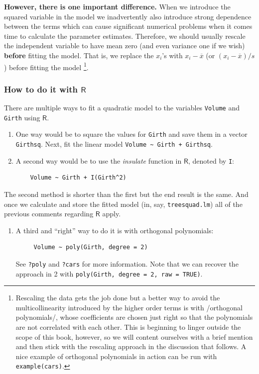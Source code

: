 \documentclass[captions=tableheading]{scrbook}
\begin{document}
\textbf{However, there is one important difference.} When we introduce the squared variable in the model we inadvertently also introduce strong dependence between the terms which can cause significant numerical problems when it comes time to calculate the parameter estimates. Therefore, we should usually rescale the independent variable to have mean zero (and even variance one if we wish) \textbf{before} fitting the model. That is, we replace the \(x_{i}\)'s with \(x_{i}-\overline{x}\) (or \((x_{i}-\overline{x})/s\)) before fitting the model
\footnote{Rescaling the data gets the job done but a better way to avoid the multicollinearity introduced by the higher order terms is with /orthogonal polynomials/, whose coefficients are chosen just right so that the polynomials are not correlated with each other. This is beginning to linger outside the scope of this book, however, so we will content ourselves with a brief mention and then stick with the rescaling approach in the discussion that follows. A nice example of orthogonal polynomials in action can be run with \texttt{example(cars)}.}.
\subsubsection{How to do it with \(\mathsf{R}\)}
\label{sec-12-4-1-1}


There are multiple ways to fit a quadratic model to the variables \texttt{Volume} and \texttt{Girth} using \(\mathsf{R}\).
\begin{enumerate}
\item One way would be to square the values for \texttt{Girth} and save them in a vector \texttt{Girthsq}. Next, fit the linear model \texttt{Volume \textasciitilde{} Girth + Girthsq}.
\item A second way would be to use the \emph{insulate} function in \(\mathsf{R}\), denoted by \texttt{I}:
\begin{verbatim}
    Volume ~ Girth + I(Girth^2)
\end{verbatim}
\end{enumerate}
The second method is shorter than the first but the end result is the same. And once we calculate and store the fitted model (in, say, \texttt{treesquad.lm}) all of the previous comments regarding \(\mathsf{R}\) apply.  
\begin{enumerate}
\item A third and ``right'' way to do it is with orthogonal polynomials:
\begin{verbatim}
     Volume ~ poly(Girth, degree = 2)
\end{verbatim}
   See \texttt{?poly} and \texttt{?cars} for more information. Note that we can recover the approach in 2 with \texttt{poly(Girth, degree = 2, raw = TRUE)}.
\end{enumerate}
\end{document}
